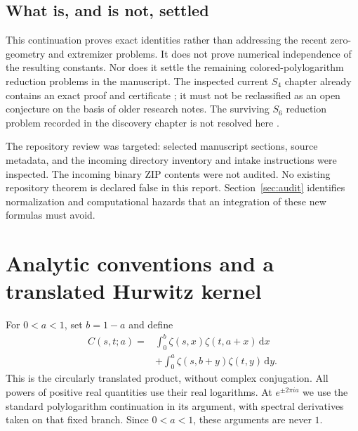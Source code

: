 \documentclass[11pt]{article}
\numberwithin{equation}{section}
\theoremstyle{definition}
\theoremstyle{remark}
\newcommand{\dd}{\,\mathrm d}
\begin{document}
\subsection{What is, and is not, settled}
This continuation proves exact identities rather than addressing the
recent zero-geometry and extremizer problems. It does not prove numerical
independence of the resulting constants. Nor does it settle the remaining
colored-polylogarithm reduction problems in the manuscript.
The inspected current $S_4$ chapter already contains an exact proof and
certificate \cite{repo-s4}; it must not be reclassified as an open
conjecture on the basis of older research notes. The surviving $S_6$
reduction problem recorded in the discovery chapter is not resolved here
\cite{repo-discovery}.

The repository review was targeted: selected manuscript sections, source
metadata, and the incoming directory inventory and intake instructions
were inspected. The incoming binary ZIP contents were not audited.
No existing repository theorem is declared false in this report.
Section~\ref{sec:audit} identifies normalization and computational hazards
that an integration of these new formulas must avoid.

\section{Analytic conventions and a translated Hurwitz kernel}
\label{sec:kernel}

For $0<a<1$, set $b=1-a$ and define
\begin{equation}
\begin{split}
 C(s,t;a)={}&\int_0^b\zeta(s,x)\zeta(t,a+x)\dd x\\
 &+\int_0^a\zeta(s,b+y)\zeta(t,y)\dd y.
 \label{eq:C-definition}
\end{split}
\end{equation}
This is the circularly translated product, without complex conjugation.
All powers of positive real quantities use their real logarithms.
At $e^{\pm2\pi ia}$ we use the standard polylogarithm continuation in its
argument, with spectral derivatives taken on that fixed branch.
Since $0<a<1$, these arguments are never $1$.
\end{document}

